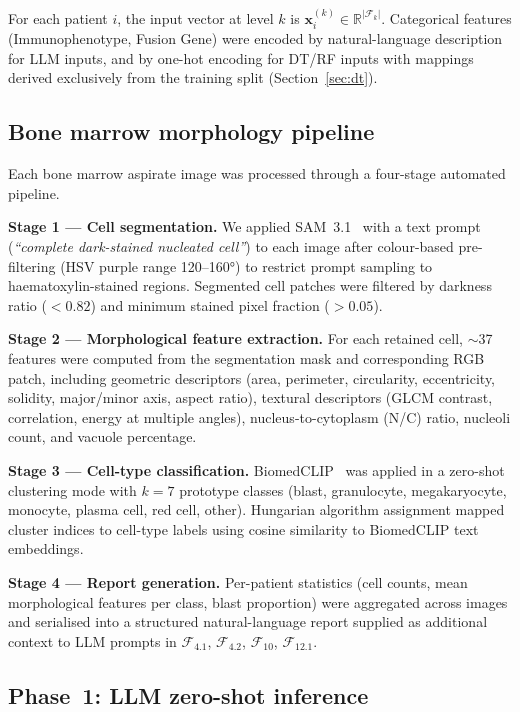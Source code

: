 \documentclass[pdflatex,sn-nature]{sn-jnl}
\begin{document}
For each patient $i$, the input vector at level $k$ is
$\mathbf{x}_i^{(k)} \in \mathbb{R}^{|\mathcal{F}_k|}$.
Categorical features (Immunophenotype, Fusion Gene) were encoded by
natural-language description for LLM inputs, and by one-hot encoding
for DT/RF inputs with mappings derived exclusively from the training
split (Section~\ref{sec:dt}).

\subsection{Bone marrow morphology pipeline}\label{sec:morph}

Each bone marrow aspirate image was processed through a four-stage
automated pipeline.

\textbf{Stage 1 — Cell segmentation.}
We applied SAM~3.1~\cite{[CITE:SAM]} with a text prompt
(\textit{``complete dark-stained nucleated cell''}) to each image
after colour-based pre-filtering (HSV purple range 120--160°) to
restrict prompt sampling to haematoxylin-stained regions.
Segmented cell patches were filtered by darkness ratio ($<0.82$)
and minimum stained pixel fraction ($>0.05$).

\textbf{Stage 2 — Morphological feature extraction.}
For each retained cell, $\sim$37 features were computed from the
segmentation mask and corresponding RGB patch, including geometric
descriptors (area, perimeter, circularity, eccentricity, solidity,
major/minor axis, aspect ratio), textural descriptors (GLCM
contrast, correlation, energy at multiple angles), nucleus-to-cytoplasm
(N/C) ratio, nucleoli count, and vacuole percentage.

\textbf{Stage 3 — Cell-type classification.}
BiomedCLIP~\cite{[CITE:BiomedCLIP]} was applied in a zero-shot
clustering mode with $k=7$ prototype classes (blast, granulocyte,
megakaryocyte, monocyte, plasma cell, red cell, other).
Hungarian algorithm assignment mapped cluster indices to cell-type
labels using cosine similarity to BiomedCLIP text embeddings.

\textbf{Stage 4 — Report generation.}
Per-patient statistics (cell counts, mean morphological features per
class, blast proportion) were aggregated across images and serialised
into a structured natural-language report supplied as additional
context to LLM prompts in $\mathcal{F}_{4.1}$, $\mathcal{F}_{4.2}$,
$\mathcal{F}_{10}$, $\mathcal{F}_{12.1}$.

\subsection{Phase~1: LLM zero-shot inference}\label{sec:llm_inference}
\end{document}

